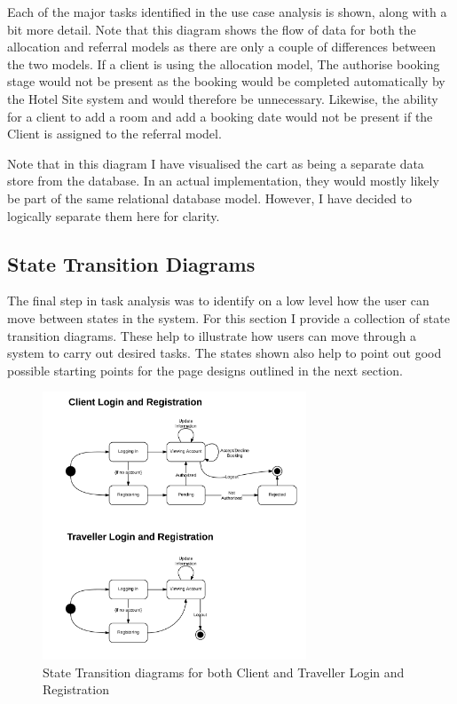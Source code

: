 \documentclass{article}
\begin{document}
Each of the major tasks identified in the use case analysis is shown, along with a bit more detail. Note that this diagram shows the flow of data for both the allocation and referral models as there are only a couple of differences between the two models. If a client is using the allocation model, The authorise booking stage would not be present as the booking would be completed automatically by the Hotel Site system and would therefore be unnecessary. Likewise, the ability for a client to add a room and add a booking date would not be present if the Client is assigned to the referral model.

Note that in this diagram I have visualised the cart as being a separate data store from the database. In an actual implementation, they would mostly likely be part of the same relational database model. However, I have decided to logically separate them here for clarity.

\subsection{State Transition Diagrams}
The final step in task analysis was to identify on a low level how the user can move between states in the system. For this section I provide a collection of state transition diagrams. These help to illustrate how users can move through a system to carry out desired tasks. The states shown also help to point out good possible starting points for the page designs outlined in the next section.

\begin{figure}[H]
\centering
\includegraphics[width=0.7\textwidth]{img/state_diagrams/StateDiagramUserAuth.png}
\caption{State Transition diagrams for both Client and Traveller Login and Registration}
\label{fig:state-user-auth}
\end{figure}
\end{document}
